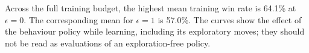 Across the full training budget, the highest mean training win rate is 64.1\% at $\epsilon=0$. The corresponding mean for $\epsilon=1$ is 57.0\%. The curves show the effect of the behaviour policy while learning, including its exploratory moves; they should not be read as evaluations of an exploration-free policy.\par
